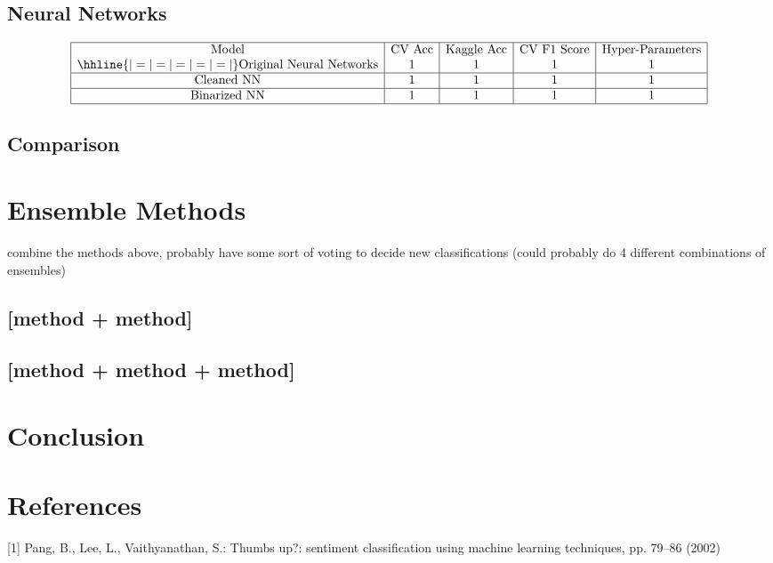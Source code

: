 \documentclass{article}
\begin{document}
\subsection{Neural Networks}
$$\begin{array}{|c|c|c|c|c|}
\hline
\text{Model} & \text{CV Acc} & \text{Kaggle Acc} & \text{CV F1 Score} & \text{Hyper-Parameters} \\
\hhline{|=|=|=|=|=|}
\text{Original Neural Networks} & 1 & 1 & 1 & 1 \\
\hline
\text{Cleaned NN} & 1 & 1 & 1 & 1 \\
\hline
\text{Binarized NN} & 1 & 1 & 1 & 1 \\
\hline
\end{array}$$

\subsection{Comparison}

\section{Ensemble Methods}
combine the methods above, probably have some sort of voting to decide new classifications (could probably do 4 different combinations of ensembles)

\subsection{[method + method]}

\subsection{[method + method + method]}

\section{Conclusion}

\section{References}
[1] Pang, B., Lee, L., Vaithyanathan, S.: Thumbs up?: sentiment classification using machine
learning techniques, pp. 79–86 (2002)
\end{document}
